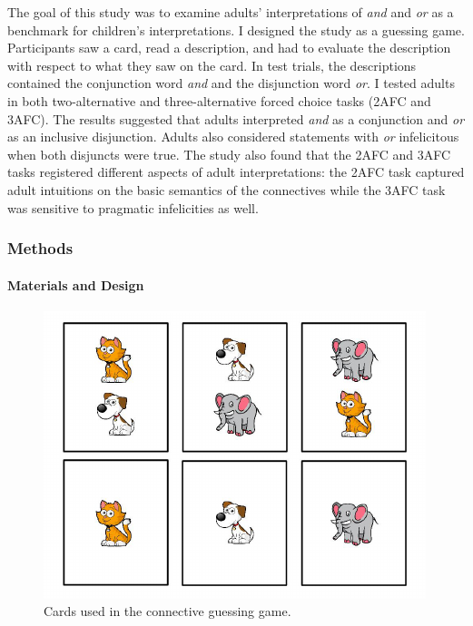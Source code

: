 \documentclass[man]{apa6}
\theoremstyle{definition}
\theoremstyle{definition}
\theoremstyle{definition}
\theoremstyle{remark}
\begin{document}
The goal of this study was to examine adults' interpretations of
\emph{and} and \emph{or} as a benchmark for children's interpretations.
I designed the study as a guessing game. Participants saw a card, read a
description, and had to evaluate the description with respect to what
they saw on the card. In test trials, the descriptions contained the
conjunction word \emph{and} and the disjunction word \emph{or}. I tested
adults in both two-alternative and three-alternative forced choice tasks
(2AFC and 3AFC). The results suggested that adults interpreted
\emph{and} as a conjunction and \emph{or} as an inclusive disjunction.
Adults also considered statements with \emph{or} infelicitous when both
disjuncts were true. The study also found that the 2AFC and 3AFC tasks
registered different aspects of adult interpretations: the 2AFC task
captured adult intuitions on the basic semantics of the connectives
while the 3AFC task was sensitive to pragmatic infelicities as well.

\subsubsection{Methods}\label{methods}

\paragraph{Materials and Design}\label{materials-and-design}

\begin{figure}[t]

{\centering \includegraphics{figs/stimuli-1} 

}

\caption{Cards used in the connective guessing game.}\label{fig:stimuli}
\end{figure}
\end{document}
